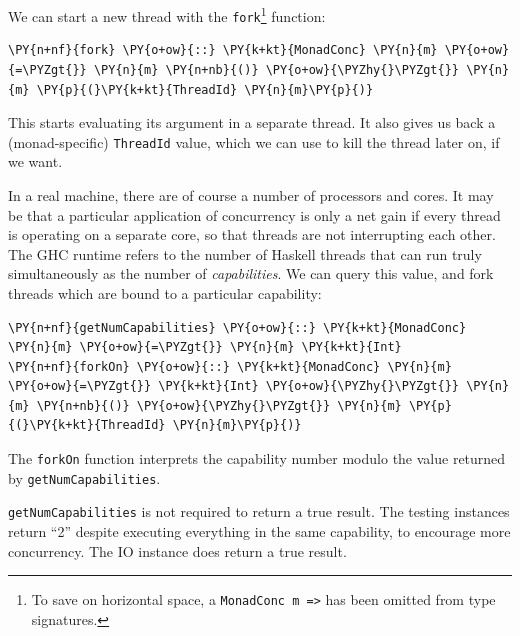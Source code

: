 We can start a new thread with the \texttt{fork}\footnote{To save on
  horizontal space, a \texttt{MonadConc m =>} has been omitted from
  type signatures.} function:


\begin{Verbatim}[commandchars=\\\{\}]
\PY{n+nf}{fork} \PY{o+ow}{::} \PY{k+kt}{MonadConc} \PY{n}{m} \PY{o+ow}{=\PYZgt{}} \PY{n}{m} \PY{n+nb}{()} \PY{o+ow}{\PYZhy{}\PYZgt{}} \PY{n}{m} \PY{p}{(}\PY{k+kt}{ThreadId} \PY{n}{m}\PY{p}{)}
\end{Verbatim}

This starts evaluating its argument in a separate thread. It also
gives us back a (monad-specific) \texttt{ThreadId} value, which we can
use to kill the thread later on, if we want.

In a real machine, there are of course a number of processors and
cores. It may be that a particular application of concurrency is only
a net gain if every thread is operating on a separate core, so that
threads are not interrupting each other. The GHC runtime refers to the
number of Haskell threads that can run truly simultaneously as the
number of \textit{capabilities}. We can query this value, and fork
threads which are bound to a particular capability:


\begin{Verbatim}[commandchars=\\\{\}]
\PY{n+nf}{getNumCapabilities} \PY{o+ow}{::} \PY{k+kt}{MonadConc} \PY{n}{m} \PY{o+ow}{=\PYZgt{}} \PY{n}{m} \PY{k+kt}{Int}
\PY{n+nf}{forkOn} \PY{o+ow}{::} \PY{k+kt}{MonadConc} \PY{n}{m} \PY{o+ow}{=\PYZgt{}} \PY{k+kt}{Int} \PY{o+ow}{\PYZhy{}\PYZgt{}} \PY{n}{m} \PY{n+nb}{()} \PY{o+ow}{\PYZhy{}\PYZgt{}} \PY{n}{m} \PY{p}{(}\PY{k+kt}{ThreadId} \PY{n}{m}\PY{p}{)}
\end{Verbatim}

The \texttt{forkOn} function interprets the capability number modulo
the value returned by \texttt{getNumCapabilities}.

\begin{departure}
  \texttt{getNumCapabilities} is not required to return a true
  result. The testing instances return ``2'' despite executing
  everything in the same capability, to encourage more
  concurrency. The IO instance does return a true result.
\end{departure}

